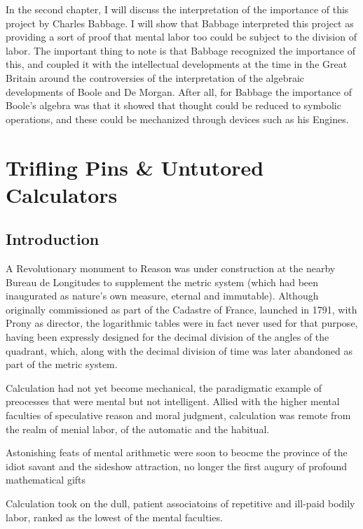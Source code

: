 \documentclass[version=last,draft=true,paper=A4,portrait,twoside=true,twocolumn=false,headinclude=false,footinclude=false,fontsize=12,BCOR=20mm,DIV=calc,pagesize=auto,titlepage=firstiscover,mpinclude=true,open=right,chapterprefix=true,numbers=autoendperiod,headsepline=false,headings=twolinechapter,parskip=false]{scrbook}
\begin{document}
In the second chapter, I will discuss the interpretation of the importance
of this project by Charles Babbage. I will show that Babbage interpreted
this project as providing a sort of proof that mental labor too could be
subject to the division of labor. The important thing to note is that
Babbage recognized the importance of this, and coupled it with the
intellectual developments at the time in the Great Britain around the
controversies of the interpretation of the algebraic developments of Boole
and De Morgan. After all, for Babbage the importance of Boole's algebra was
that it showed that thought could be reduced to symbolic operations, and
these could be mechanized through devices such as his Engines. 
\chapter{Trifling Pins \& Untutored Calculators}
\label{sec:orgfdb1c32}
\section{Introduction}
\label{sec:org5ea05cf}

A Revolutionary monument to Reason was under construction at the nearby
Bureau de Longitudes to supplement the metric system (which had been
inaugurated as nature's own measure, eternal and immutable). Although
originally commissioned as part of the Cadastre of France, launched in
1791, with Prony as director, the logarithmic tables were in fact never
used for that purpose, having been expressly designed for the decimal
division of the angles of the quadrant, which, along with the decimal
division of time was later abandoned as part of the metric system.

Calculation had not yet become mechanical, the paradigmatic example of
preocesses that were mental but not intelligent. Allied with the higher
mental faculties of speculative reason and moral judgment, calculation was
remote from the realm of menial labor, of the automatic and the habitual.

Astonishing feats of mental arithmetic were soon to beocme the province of
the idiot savant and the sideshow attraction, no longer the first augury of
profound mathematical gifts

Calculation took on the dull, patient associatoins of repetitive and
ill-paid bodily labor, ranked as the lowest of the mental faculties.
\end{document}
